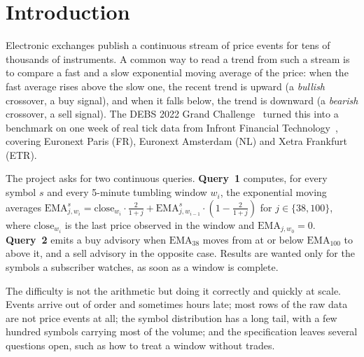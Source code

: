\section{Introduction}

Electronic exchanges publish a continuous stream of price events for tens of thousands of instruments.
A common way to read a trend from such a stream is to compare a fast and a slow exponential moving average of the price: when the fast average rises above the slow one, the recent trend is upward (a \emph{bullish} crossover, a buy signal), and when it falls below, the trend is downward (a \emph{bearish} crossover, a sell signal).
The DEBS 2022 Grand Challenge~\cite{frischbier2022debs} turned this into a benchmark on one week of real tick data from Infront Financial Technology~\cite{frischbier2022dataset}, covering Euronext Paris (FR), Euronext Amsterdam (NL) and Xetra Frankfurt (ETR).

The project asks for two continuous queries.
\textbf{Query~1} computes, for every symbol $s$ and every 5-minute tumbling window $w_i$, the exponential moving averages
$\mathrm{EMA}^{s}_{j,w_i} = \mathrm{close}_{w_i}\cdot\frac{2}{1+j} + \mathrm{EMA}^{s}_{j,w_{i-1}}\cdot\left(1-\frac{2}{1+j}\right)$ for $j \in \{38, 100\}$, where $\mathrm{close}_{w_i}$ is the last price observed in the window and $\mathrm{EMA}_{j,w_0}=0$.
\textbf{Query~2} emits a buy advisory when $\mathrm{EMA}_{38}$ moves from at or below $\mathrm{EMA}_{100}$ to above it, and a sell advisory in the opposite case.
Results are wanted only for the symbols a subscriber watches, as soon as a window is complete.

The difficulty is not the arithmetic but doing it correctly and quickly at scale.
Events arrive out of order and sometimes hours late; most rows of the raw data are not price events at all; the symbol distribution has a long tail, with a few hundred symbols carrying most of the volume; and the specification leaves several questions open, such as how to treat a window without trades.

